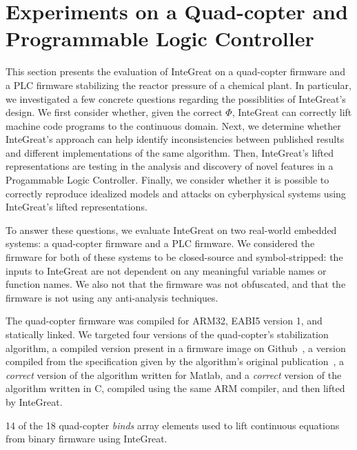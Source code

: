 \section{Experiments on a Quad-copter and Programmable Logic Controller}

This section presents the evaluation of InteGreat on a quad-copter firmware and a PLC firmware stabilizing the reactor pressure of a chemical plant.
In particular, we investigated a few concrete questions regarding the possiblities of InteGreat's design.
We first consider whether, given the correct $\Phi$, InteGreat can correctly lift machine code programs to the continuous domain.
Next, we determine whether InteGreat's approach can help identify inconsistencies between published results and different implementations of the same algorithm.
Then, InteGreat's lifted representations are testing in the analysis and discovery of novel features in a Progammable Logic Controller.
Finally, we consider whether it is possible to correctly reproduce idealized models and attacks on cyberphysical systems using InteGreat's lifted representations.

To answer these questions, we evaluate InteGreat on two real-world embedded systems: a quad-copter firmware and a PLC firmware.
We considered the firmware for both of these systems to be closed-source and symbol-stripped: the inputs to InteGreat are not dependent on any meaningful variable names or function names.
We also not that the firmware was not obfuscated, and that the firmware is not using any anti-analysis techniques.



The quad-copter firmware was compiled for ARM32, EABI5 version 1, and statically linked.
We targeted four versions of the quad-copter's stabilization algorithm, a compiled version present in a firmware image on Github~\cite{drone}, a version compiled from the specification given by the algorithm's original publication~\cite{madgwick}, a \emph{correct} version of the algorithm written for Matlab, and a \emph{correct} version of the algorithm written in C, compiled using the same ARM compiler, and then lifted by InteGreat.

\begin{table}
\caption{14 of the 18 quad-copter \emph{binds} array elements used to lift continuous equations from binary firmware using InteGreat.}
\label{tab:quadcopt-binds}

\end{table}

